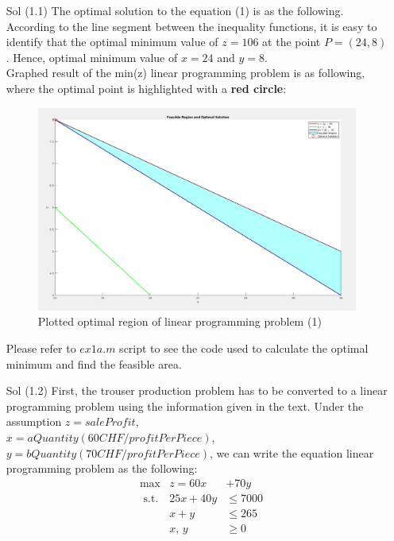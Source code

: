 \documentclass[unicode,11pt,a4paper,oneside,numbers=endperiod,openany]{scrartcl}
\begin{document}
\vspace{20px}

\begin{enumerate}
 \item[Sol (1.1)] The optimal solution to the equation (1) is as the following. According to the line segment between the inequality functions, it is easy to identify that the optimal minimum value of ${z = 106}$ at the point ${P=(24,8)}$. Hence, optimal minimum value of ${x = 24}$ and ${y = 8}$.   \\

    Graphed result of the min(z) linear programming problem is as following, where the optimal point is highlighted with a \textbf{red circle}: \\
\begin{figure}[h!]
    \begin{minipage}[c]{1\linewidth}
        \centering
        \includegraphics[width=0.9\linewidth]{./figure1.png}
    \end{minipage}
    \caption{Plotted optimal region of linear programming problem (1)}
\end{figure}

Please refer to ${ex1a.m}$ script to see the code used to calculate the optimal minimum and find the feasible area. \\

\item[Sol (1.2)] First, the trouser production problem has to be converted to a linear programming problem using the information given in the text. Under the assumption ${z = saleProfit}$, \\ ${x = aQuantity(60CHF/profitPerPiece)}$, ${y = bQuantity(70CHF/profitPerPiece)}$, we can write the equation linear programming problem as the following: \\

\begin{equation*}
		\begin{aligned}
		& \text{max}  &  z=60x&+70y\\
		& \text{ s.t.} &  25x+40y &\leq 7000 \\
		& &   x+y &\leq 265\\
		& &  x,\,y &\geq0 \\
		\end{aligned}
		\end{equation*}
\end{enumerate}
\end{document}
